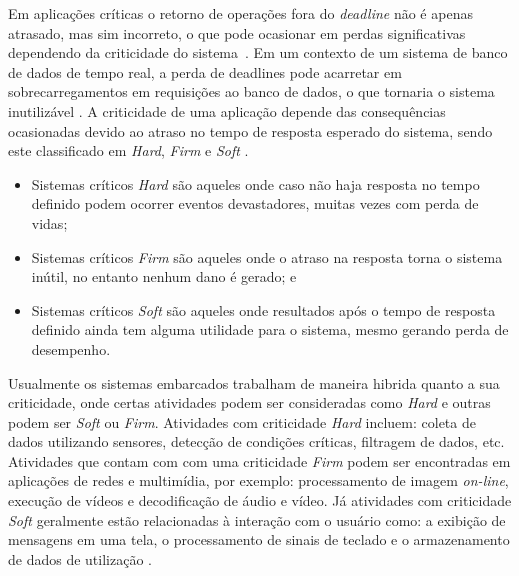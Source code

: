 Em aplicações críticas o retorno de operações fora do \textit{deadline} não é apenas atrasado, mas sim incorreto, o que pode ocasionar em perdas significativas dependendo da criticidade do sistema~\cite{BUTTAZZO:2011}. Em um contexto de um sistema de banco de dados de tempo real, a perda de deadlines pode acarretar em sobrecarregamentos em requisições ao banco de dados, o que tornaria o sistema inutilizável \cite{bd:1991}. A criticidade de uma aplicação depende das consequências ocasionadas devido ao atraso no tempo de resposta esperado do sistema, sendo este classificado em \textit{Hard}, \textit{Firm} e \textit{Soft} \cite{BUTTAZZO:2011}.

\begin{itemize}
\item Sistemas críticos \textit{Hard} são aqueles onde caso não haja resposta no tempo definido podem ocorrer eventos devastadores, muitas vezes com perda de vidas;
\item Sistemas críticos \textit{Firm} são aqueles onde o atraso na resposta torna o sistema inútil, no entanto nenhum dano é gerado; e
\item Sistemas críticos \textit{Soft} são aqueles onde resultados após o tempo de resposta definido ainda tem alguma utilidade para o sistema, mesmo gerando perda de desempenho.
\end{itemize}


Usualmente os sistemas embarcados trabalham de maneira hibrida quanto a sua criticidade, onde certas atividades podem ser consideradas como \textit{Hard} e outras podem ser \textit{Soft} ou \textit{Firm}. Atividades com criticidade \textit{Hard} incluem: coleta de dados utilizando sensores, detecção de condições críticas, filtragem de dados, etc. Atividades que contam com com uma criticidade \textit{Firm} podem ser encontradas em aplicações de redes e multimídia, por exemplo: processamento de imagem \textit{on-line}, execução de vídeos e decodificação de áudio e vídeo. Já atividades com criticidade \textit{Soft} geralmente estão relacionadas à interação com o usuário como: a exibição de mensagens em uma tela, o processamento de sinais de teclado e o armazenamento de dados de utilização \cite{BUTTAZZO:2011}.



